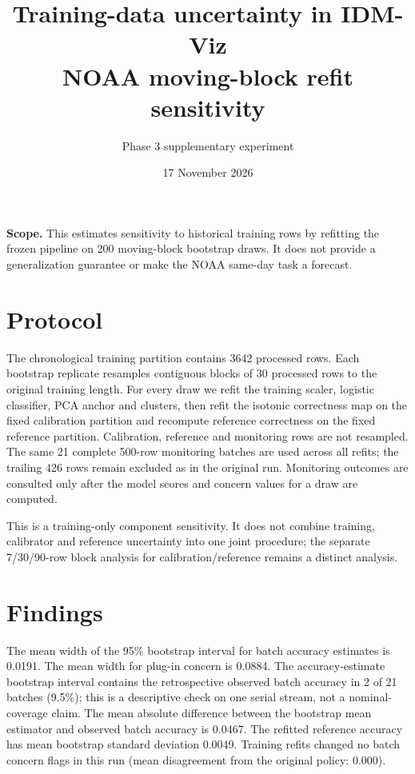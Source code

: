 \documentclass[10pt,a4paper]{article}
\title{\vspace{-2em}\color{ink}\bfseries Training-data uncertainty in IDM-Viz\\[.2em]\large NOAA moving-block refit sensitivity}
\author{Phase 3 supplementary experiment}\date{17 November 2026}
\begin{document}
\maketitle\vspace{-1em}
\begin{tcolorbox}[colback=mist,colframe=teal,boxrule=0pt,leftrule=2mm]\textbf{Scope.} This estimates sensitivity to historical training rows by refitting the frozen pipeline on 200 moving-block bootstrap draws. It does not provide a generalization guarantee or make the NOAA same-day task a forecast.
\end{tcolorbox}
\section*{Protocol}
The chronological training partition contains 3642{} processed rows. Each bootstrap replicate resamples contiguous blocks of 30{} processed rows to the original training length. For every draw we refit the training scaler, logistic classifier, PCA anchor and clusters, then refit the isotonic correctness map on the fixed calibration partition and recompute reference correctness on the fixed reference partition. Calibration, reference and monitoring rows are not resampled. The same 21 complete 500-row monitoring batches are used across all refits; the trailing 426 rows remain excluded as in the original run. Monitoring outcomes are consulted only after the model scores and concern values for a draw are computed.

This is a training-only component sensitivity. It does not combine training, calibrator and reference uncertainty into one joint procedure; the separate 7/30/90-row block analysis for calibration/reference remains a distinct analysis.
\section*{Findings}
The mean width of the 95\% bootstrap interval for batch accuracy estimates is 0.0191. The mean width for plug-in concern is 0.0884. The accuracy-estimate bootstrap interval contains the retrospective observed batch accuracy in 2{} of 21 batches (9.5\%); this is a descriptive check on one serial stream, not a nominal-coverage claim. The mean absolute difference between the bootstrap mean estimator and observed batch accuracy is 0.0467. The refitted reference accuracy has mean bootstrap standard deviation 0.0049. Training refits changed no batch concern flags in this run (mean disagreement from the original policy: 0.000).
\end{document}
